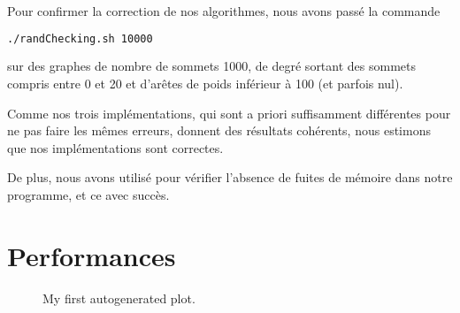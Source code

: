 \documentclass[12p0t,a4paper]{article}
\begin{document}
Pour confirmer la correction de nos algorithmes, nous avons passé la commande

\begin{lstlisting}[language=bash]
./randChecking.sh 10000
\end{lstlisting}

sur des graphes de nombre de sommets 1000, de degré sortant des sommets compris entre 0 et 20 et d'arêtes de poids inférieur à 100 (et parfois nul).

Comme nos trois implémentations, qui sont a priori suffisamment différentes pour ne pas faire les mêmes erreurs, donnent des résultats cohérents, nous estimons que nos implémentations sont correctes.

De plus, nous avons utilisé  pour vérifier l'absence de fuites de mémoire dans notre programme, et ce avec succès.

\section{Performances}


\begin{figure}[h!]
  \begin{center}
    \caption{My first autogenerated plot.}
  \end{center}
\end{figure}
\end{document}
